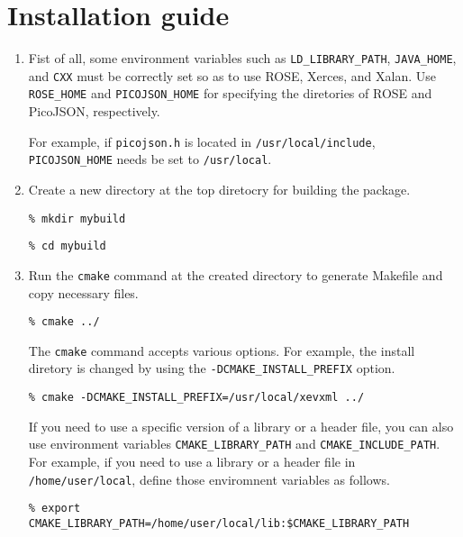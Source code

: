 \section{Installation guide}
\begin{enumerate}
 \item Fist of all, some environment variables such as
       \texttt{LD\_LIBRARY\_PATH}, \texttt{JAVA\_HOME}, and \texttt{CXX}
       must be correctly set so as to use ROSE, Xerces, and Xalan. Use
       \texttt{ROSE\_HOME} and \texttt{PICOJSON\_HOME} for specifying
       the diretories of ROSE and PicoJSON, respectively.

       For example, if \texttt{picojson.h} is located in
       \texttt{/usr/local/include}, \texttt{PICOJSON\_HOME} needs be set
       to \texttt{/usr/local}.


 \item Create a new directory at the top diretocry for building the package.
       
       \vspace{5mm}
       \texttt{\% mkdir mybuild}

       \texttt{\% cd mybuild}
       \vspace{5mm}

 \item Run the \texttt{cmake} command at the created directory to
       generate Makefile and copy necessary files.

       \vspace{5mm}
       \texttt{\% cmake ../}
       \vspace{5mm}

       The \texttt{cmake} command accepts various options. For example,
       the install diretory is changed by using the
       \texttt{-DCMAKE\_INSTALL\_PREFIX} option.

       \vspace{5mm}
       \texttt{\% cmake -DCMAKE\_INSTALL\_PREFIX=/usr/local/xevxml ../}
       \vspace{5mm}

       If you need to use a specific version of a library or a header
       file, you can also use environment variables
       \texttt{CMAKE\_LIBRARY\_PATH} and \texttt{CMAKE\_INCLUDE\_PATH}.
       For example, if you need to use a library or a header file in
       \texttt{/home/user/local}, define those enviromnent variables as
       follows.

       \vspace{5mm}
       \texttt{\% export CMAKE\_LIBRARY\_PATH=/home/user/local/lib:\$CMAKE\_LIBRARY\_PATH}


\end{enumerate}
